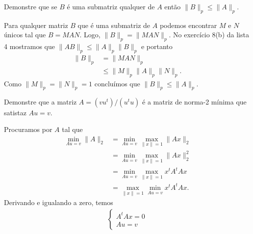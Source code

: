 \documentclass[a4paper,12pt, leqno, answers]{exam}
\begin{document}
\begin{questions}
    \question Demonstre que se $B$ \'{e} uma submatriz qualquer de $A$ ent\~{a}o $\| B \|_p \leq \| A \|_p$.
    \begin{solution}
        Para qualquer matriz $B$ que \'{e} uma submatriz de $A$ podemos encontrar $M$ e $N$ \'{u}nicos tal que $B = M A N$. Logo, $\| B \|_p = \| M A N \|_p$. No exerc\'{i}cio 8(b) da lista 4 mostramos que $\| A B \|_p \leq \| A \|_p \| B \|_p$ e portanto
        \begin{align*}
            \| B \|_p &= \| M A N \|_p \\
            &\leq \| M \|_p \| A \|_p \| N \|_p.
        \end{align*}
        Como $\| M \|_p = \| N \|_p = 1$ conclu\'{i}mos que $\| B \|_p \leq \| A \|_p$.
    \end{solution}

    \question Demonstre que a matriz $A = (v u^t) / (u^t u)$ \'{e} a matriz de norma-2 m\'{i}nima que satistaz $A u = v$.
    \begin{solution}
        Procuramos por $A$ tal que
        \begin{align*}
            \min_{A u = v} \| A \|_2 &= \min_{A u = v} \max_{\| x \| = 1} \| A x \|_2 \\
            &= \min_{A u = v} \max_{\| x \| = 1} \| A x \|_2^2 \\
            &= \min_{A u = v} \max_{\| x \| = 1} x^t A^t A x \\
            &= \max_{\| x \| = 1} \min_{A u = v} x^t A^t A x.
        \end{align*}
        Derivando e igualando a zero, temos
        \begin{align*}
            \begin{cases}
                A^t A x = 0 \\
                A u = v
            \end{cases}
        \end{align*}
    \end{solution}
\end{questions}


\end{document}
